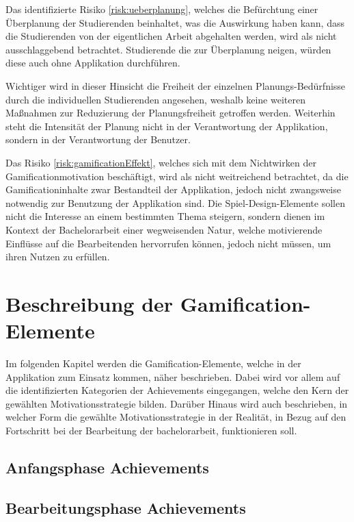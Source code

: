 \documentclass{scrreprt}
\begin{document}
\par \medskip  Das identifizierte Risiko \ref{risk:ueberplanung}, welches die Befürchtung einer Überplanung der Studierenden beinhaltet, was die Auswirkung haben kann, dass die Studierenden von der eigentlichen Arbeit abgehalten werden, wird als nicht ausschlaggebend betrachtet.
Studierende die zur Überplanung neigen, würden diese auch ohne Applikation durchführen. 
\par Wichtiger wird in dieser Hinsicht die Freiheit der einzelnen Planungs-Bedürfnisse durch die individuellen Studierenden angesehen, weshalb keine weiteren Maßnahmen zur Reduzierung der Planungsfreiheit getroffen werden. Weiterhin steht die Intensität der Planung nicht in der Verantwortung der Applikation, sondern in der Verantwortung der Benutzer. 

\par \medskip Das Risiko \ref{risk:gamificationEffekt}, welches sich mit dem Nichtwirken der Gamificationmotivation beschäftigt, wird als nicht weitreichend betrachtet, da die Gamificationinhalte zwar Bestandteil der Applikation, jedoch nicht zwangsweise notwendig zur Benutzung der Applikation sind. Die Spiel-Design-Elemente sollen nicht die Interesse an einem bestimmten Thema steigern, sondern dienen im Kontext der Bachelorarbeit einer wegweisenden Natur, welche motivierende Einflüsse auf die Bearbeitenden hervorrufen können, jedoch nicht müssen, um ihren Nutzen zu erfüllen. 


\newpage
\section{Beschreibung der Gamification-Elemente} \label{sec:gamificationelemente}
\par Im folgenden Kapitel werden die Gamification-Elemente, welche in der Applikation zum Einsatz kommen, näher beschrieben. Dabei wird vor allem auf die identifizierten Kategorien der Achievements eingegangen, welche den Kern der gewählten Motivationsstrategie bilden. Darüber Hinaus wird auch beschrieben, in welcher Form die gewählte Motivationsstrategie in der Realität, in Bezug auf den Fortschritt bei der Bearbeitung der bachelorarbeit, funktionieren soll.

\subsection{Anfangsphase Achievements}

\subsection{Bearbeitungsphase Achievements}
\end{document}
